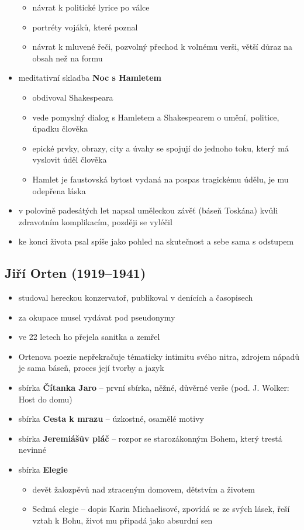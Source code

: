 \begin{itemize}
	\begin{itemize}
	\item návrat k politické lyrice po válce
	\item portréty vojáků, které poznal
	\item návrat k mluvené řeči, pozvolný přechod k volnému verši, větší důraz na obsah než na formu
	\end{itemize}
\item meditativní skladba \textbf{Noc s Hamletem}
	\begin{itemize}
	\item obdivoval Shakespeara
	\item vede pomyslný dialog s Hamletem a Shakespearem o umění, politice, úpadku člověka
	\item epické prvky, obrazy, city a úvahy se spojují do jednoho toku, který má vyslovit úděl člověka
	\item Hamlet je faustovská bytost vydaná na pospas tragickému údělu, je mu odepřena láska
	\end{itemize}
\item v polovině padesátých let napsal uměleckou závěť (báseň Toskána) kvůli zdravotním komplikacím, později se vyléčil
\item ke konci života psal spíše jako pohled na skutečnost a sebe sama s odstupem
\end{itemize}

\subsection{Jiří Orten (1919--1941)}
\begin{itemize}
\item studoval hereckou konzervatoř, publikoval v denících a časopisech
\item za okupace musel vydávat pod pseudonymy 
\item ve 22 letech ho přejela sanitka a zemřel
\item Ortenova poezie nepřekračuje tématicky intimitu svého nitra, zdrojem nápadů je sama báseň, proces její tvorby a jazyk
\item sbírka \textbf{Čítanka Jaro} -- první sbírka, něžné, důvěrné verše (pod. J. Wolker: Host do domu)
\item sbírka \textbf{Cesta k mrazu} -- úzkostné, osamělé motivy
\item sbírka \textbf{Jeremiášův pláč} -- rozpor se starozákonným Bohem, který trestá nevinné
\item sbírka \textbf{Elegie}
	\begin{itemize}
	\item devět žalozpěvů nad ztraceným domovem, dětstvím a životem
	\item Sedmá elegie -- dopis Karin Michaelisové, zpovídá se ze svých lásek, řeší vztah k Bohu, život mu připadá jako absurdní sen
	\end{itemize}
\end{itemize}

